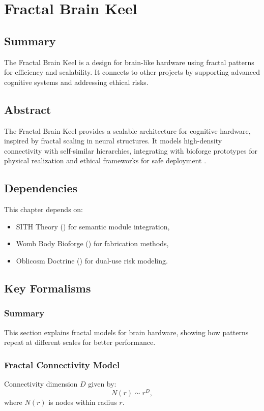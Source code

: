 \documentclass[11pt,oneside]{memoir}
\theoremstyle{plain}
\begin{document}
\chapter{Fractal Brain Keel}
\label{sec:fractal_brain}

\section{Summary}
The Fractal Brain Keel is a design for brain-like hardware using fractal patterns for efficiency and scalability. It connects to other projects by supporting advanced cognitive systems and addressing ethical risks.

\section{Abstract}
The Fractal Brain Keel provides a scalable architecture for cognitive hardware, inspired by fractal scaling in neural structures. It models high-density connectivity with self-similar hierarchies, integrating with bioforge prototypes for physical realization and ethical frameworks for safe deployment \cite{fractal_brain}.

\section{Dependencies}
This chapter depends on:
\begin{itemize}
    \item SITH Theory () for semantic module integration,
    \item Womb Body Bioforge () for fabrication methods,
    \item Oblicosm Doctrine () for dual-use risk modeling.
\end{itemize}

\section{Key Formalisms}
\subsection{Summary}
This section explains fractal models for brain hardware, showing how patterns repeat at different scales for better performance.

\subsection{Fractal Connectivity Model}
Connectivity dimension \(D\) given by:
\begin{equation}
    N(r) \sim r^D,
\end{equation}
where \(N(r)\) is nodes within radius \(r\).
\end{document}
